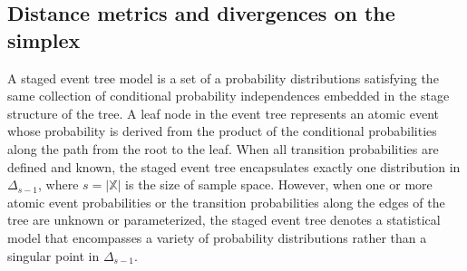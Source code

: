 \documentclass[preprint,12pt]{elsarticle}
\begin{document}
\subsection{ 
Distance metrics and divergences on the simplex
}
\label{section:2}







A staged event tree model is a set of a probability distributions satisfying the same collection of conditional probability independences embedded in the stage structure of the tree. 
A leaf node in the event tree represents an atomic event 
whose probability is derived from the product of the conditional probabilities along the path from the root to the leaf. 
When all transition probabilities are defined and known, the staged event tree encapsulates exactly one distribution in \( \Delta_{s-1} \), where $s=|\mathbb{X}|$ is the size of sample space. 
However, when one or more atomic event probabilities or the transition probabilities along the edges of the tree are unknown or parameterized, the staged event tree denotes a statistical model that encompasses a variety of probability distributions rather than a singular point in \( \Delta_{s-1} \). 
\end{document}
